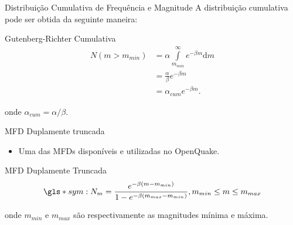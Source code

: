 \documentclass[ucs,8pt]{beamer}
\begin{document}
\begin{frame}{Distribuição Cumulativa de Frequência e Magnitude}
A distribuição \alert{cumulativa} pode ser obtida da seguinte maneira: 
	\begin{block}{Gutenberg-Richter Cumulativa}
		\begin{equation}
			\begin{split}
				N(m > m_{min}) &= \alpha \int\limits_{m_{min}}^{\infty}e^{-\beta m}\mathrm{d}m \\
							   &= \frac{\alpha}{\beta} e^{-\beta m} \\
							   &= \alpha_{cum} e^{-\beta m}.
			\end{split}
			\label{eq:gr_cum}
		\end{equation}
	\end{block}
	onde $\alpha_{cum} = \alpha / \beta $.
\end{frame}


\begin{frame}{MFD Duplamente truncada}

\begin{itemize}
  \item Uma das MFDs disponíveis e utilizadas no OpenQuake.
\end{itemize}

	\begin{block}{MFD Duplamente Truncada}
	\begin{equation}
			\gls*{sym:N_m} = \frac{e^{-\beta (m - m_{min})}}{1 -e^{-\beta (m_{max} - m_{min}) } } , m_{min} \leq m \leq m_{max}
		\label{eq:gr_dtr}
	\end{equation}
	\end{block}
	onde $m_{min}$ e $m_{max}$ são respectivamente as magnitudes mínima e máxima.
\end{frame}
\end{document}
